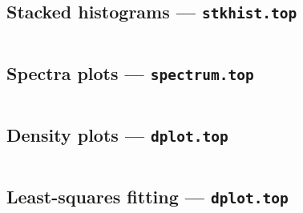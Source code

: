 \newpage

\subsection{Stacked histograms --- {\tt stkhist.top}}

\vspace{1cm}

\begin{verbatim}

\end{verbatim}

\vspace{1cm}
\def\epsfsize#1#2{\scalea #1}

\newpage

\subsection{Spectra plots --- {\tt spectrum.top}}

\vspace{0.4cm}

\begin{verbatim}

\end{verbatim}

\vspace{0.4cm}
\def\epsfsize#1#2{\scaled #1}

\newpage
\subsection{Density plots --- {\tt dplot.top}}

\vspace{1cm}

\begin{verbatim}

\end{verbatim}

\vspace{1cm}
\def\epsfsize#1#2{\scaleb #1}

\newpage
\subsection{Least-squares fitting --- {\tt dplot.top}}

\vspace{1cm}

\begin{verbatim}

\end{verbatim}

